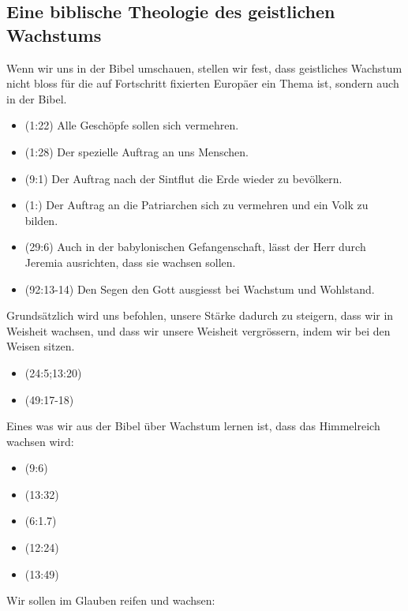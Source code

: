\documentclass{../../inc/mybib}
\begin{document}
\subsection{Eine biblische Theologie des geistlichen Wachstums}
Wenn wir uns in der Bibel umschauen, stellen wir fest, dass geistliches Wachstum nicht bloss für die auf Fortschritt fixierten Europäer ein Thema ist, sondern auch in der Bibel.
\begin{itemize}
    \item {}(1:22) Alle Geschöpfe sollen sich vermehren.
    \item {}(1:28) Der spezielle Auftrag an uns Menschen.
    \item {}(9:1) Der Auftrag nach der Sintflut die Erde wieder zu bevölkern.
    \item {}(1:) Der Auftrag an die Patriarchen sich zu vermehren und ein Volk zu bilden.
    \item {}(29:6) Auch in der babylonischen Gefangenschaft, lässt der Herr durch Jeremia ausrichten, dass sie wachsen sollen.
    \item {}(92:13-14) Den Segen den Gott ausgiesst bei Wachstum und Wohlstand.
\end{itemize}
Grundsätzlich wird uns befohlen, unsere Stärke dadurch zu steigern, dass wir in Weisheit wachsen, und dass wir unsere Weisheit vergrössern, indem wir bei den Weisen sitzen. 
\begin{itemize}
    \item {}(24:5;13:20)
    \item {}(49:17-18)
\end{itemize}
Eines was wir aus der Bibel über Wachstum lernen ist, dass das Himmelreich wachsen wird:
\begin{itemize}
    \item {}(9:6)
    \item {}(13:32)
    \item {}(6:1.7)
    \item {}(12:24)
    \item {}(13:49)
\end{itemize}
Wir sollen im Glauben reifen und wachsen:
\end{document}
